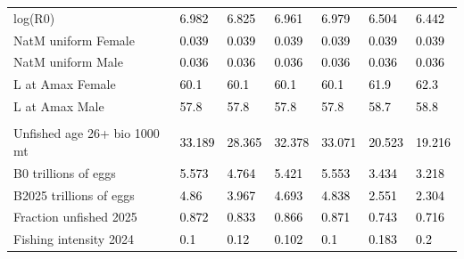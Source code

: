 \documentclass[
  english,
]{article}
\begin{document}
\begin{landscape}
\begin{longtable}[t]{ll>{\raggedright\arraybackslash}p{5em}>{\raggedright\arraybackslash}p{5em}>{\raggedright\arraybackslash}p{5em}>{\raggedright\arraybackslash}p{5em}>{\raggedright\arraybackslash}p{5em}}
\hspace{1em}log(R0) & \textcolor{black}{6.982} & \textcolor{black}{6.825} & \textcolor{black}{6.961} & \textcolor{black}{6.979} & \textcolor{black}{6.504} & \textcolor{black}{6.442}\\
\hspace{1em}NatM uniform Female & \textcolor{black}{0.039} & \textcolor{black}{0.039} & \textcolor{black}{0.039} & \textcolor{black}{0.039} & \textcolor{black}{0.039} & \textcolor{black}{0.039}\\
\hspace{1em}NatM uniform Male & \textcolor{black}{0.036} & \textcolor{black}{0.036} & \textcolor{black}{0.036} & \textcolor{black}{0.036} & \textcolor{black}{0.036} & \textcolor{black}{0.036}\\
\hspace{1em}L at Amax Female & \textcolor{black}{60.1} & \textcolor{black}{60.1} & \textcolor{black}{60.1} & \textcolor{black}{60.1} & \textcolor{black}{61.9} & \textcolor{black}{62.3}\\
\hspace{1em}L at Amax Male & \textcolor{black}{57.8} & \textcolor{black}{57.8} & \textcolor{black}{57.8} & \textcolor{black}{57.8} & \textcolor{black}{58.7} & \textcolor{black}{58.8}\\
\addlinespace[0.3em]
\multicolumn{7}{l}{\textbf{Estimates of derived quantities}}\\
\hspace{1em}Unfished age 26+ bio 1000 mt & \textcolor{black}{33.189} & \textcolor{black}{28.365} & \textcolor{black}{32.378} & \textcolor{black}{33.071} & \textcolor{black}{20.523} & \textcolor{black}{19.216}\\
\hspace{1em}B0 trillions of eggs & \textcolor{black}{5.573} & \textcolor{black}{4.764} & \textcolor{black}{5.421} & \textcolor{black}{5.553} & \textcolor{black}{3.434} & \textcolor{black}{3.218}\\
\hspace{1em}B2025 trillions of eggs & \textcolor{black}{4.86} & \textcolor{black}{3.967} & \textcolor{black}{4.693} & \textcolor{black}{4.838} & \textcolor{black}{2.551} & \textcolor{black}{2.304}\\
\hspace{1em}Fraction unfished 2025 & \textcolor{black}{0.872} & \textcolor{black}{0.833} & \textcolor{black}{0.866} & \textcolor{black}{0.871} & \textcolor{black}{0.743} & \textcolor{black}{0.716}\\
\hspace{1em}Fishing intensity 2024 & \textcolor{black}{0.1} & \textcolor{black}{0.12} & \textcolor{black}{0.102} & \textcolor{black}{0.1} & \textcolor{black}{0.183} & \textcolor{black}{0.2}\\

\end{longtable}
\end{landscape}
\end{document}
